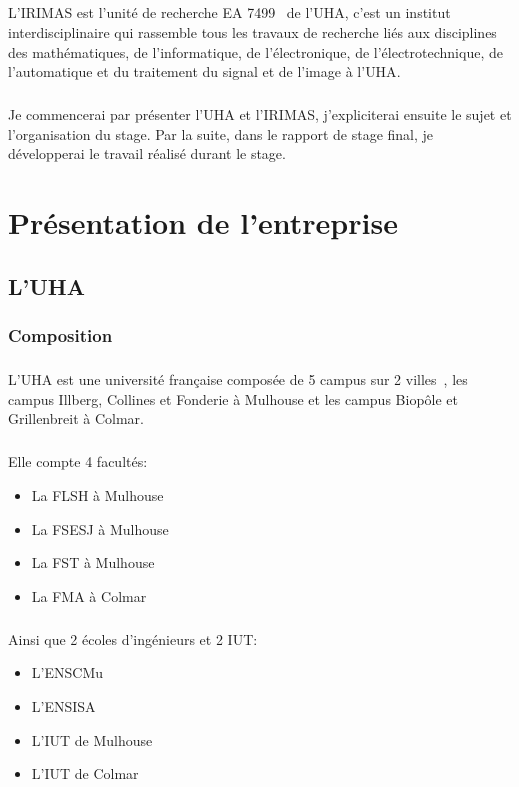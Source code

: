 \documentclass[a4paper,11pt,twoside,french,report]{../common/simplem}
\begin{document}
		\paragraph*{}
			L'\gls{IRIMAS} est l'unité de recherche EA 7499~\cite{RNSR_IRIMAS} de l'\gls{UHA}, c'est un institut interdisciplinaire qui rassemble tous les travaux de recherche liés aux disciplines des mathématiques, de l'informatique, de l'électronique, de l'électrotechnique, de l'automatique et du traitement du signal et de l'image à l'\gls{UHA}.
		\paragraph*{}
			Je commencerai par présenter l'\gls{UHA} et l'\gls{IRIMAS}, j'expliciterai ensuite le sujet et l'organisation du stage. Par la suite, dans le rapport de stage final, je développerai le travail réalisé durant le stage.
	\chapter{Présentation de l'entreprise}
		\section{L'\acrshort{UHA}}
			\subsection{Composition}
				\paragraph*{}
					L'\gls{UHA} est une université française composée de 5 campus sur 2 villes~\cite{UHA_Organisation}, les campus Illberg, Collines et Fonderie à Mulhouse et les campus Biopôle et Grillenbreit à Colmar.
				\paragraph*{}
					Elle compte 4 facultés:
					\begin{itemize}
						\item La \gls{FLSH} à Mulhouse
						\item La \gls{FSESJ} à Mulhouse
						\item La \gls{FST} à Mulhouse
						\item La \gls{FMA} à Colmar
					\end{itemize}
				\paragraph*{}
					Ainsi que 2 écoles d'ingénieurs et 2 \gls{IUT}:
					\begin{itemize}
						\item L'\gls{ENSCMu}
						\item L'\gls{ENSISA}
						\item L'\gls{IUT} de Mulhouse
						\item L'\gls{IUT} de Colmar
					\end{itemize}
\end{document}
